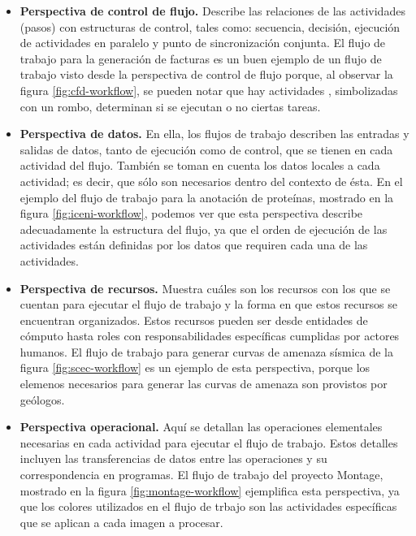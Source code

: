 \begin{itemize}
\item{\textbf{Perspectiva de control de flujo.} Describe las relaciones de las actividades (pasos) con estructuras de control, tales como: secuencia, decisión, ejecución de actividades en paralelo y punto de sincronización conjunta. El flujo de trabajo para la generación de facturas es un buen ejemplo de un flujo de trabajo visto desde la perspectiva de control de flujo porque, al observar la figura \ref{fig:cfd-workflow}, se pueden notar que hay actividades , simbolizadas con un rombo, determinan si se ejecutan o no ciertas tareas.
}

\item{\textbf{Perspectiva de datos.} En ella, los flujos de trabajo describen las entradas y salidas de datos, tanto de ejecución como de control, que se tienen en cada actividad del flujo. También se toman en cuenta los datos locales a cada actividad; es decir, que sólo son necesarios dentro del contexto de ésta. En el ejemplo del flujo de trabajo para la anotación de proteínas, mostrado en la figura \ref{fig:iceni-workflow}, podemos ver que esta perspectiva describe adecuadamente la estructura del flujo, ya que el orden de ejecución de las actividades están definidas por los datos que requiren cada una de las actividades.}

\item{\textbf{Perspectiva de recursos.} Muestra cuáles son los recursos con los que se cuentan para ejecutar el flujo de trabajo y la forma en que estos recursos se encuentran organizados. Estos recursos pueden ser desde entidades de cómputo hasta roles con responsabilidades específicas cumplidas por actores humanos. El flujo de trabajo para generar curvas de amenaza sísmica de la figura \ref{fig:scec-workflow} es un ejemplo de esta perspectiva, porque los elemenos necesarios para generar las curvas de amenaza son provistos por geólogos.}

\item{\textbf{Perspectiva operacional.} Aquí se detallan las operaciones elementales necesarias en cada actividad para ejecutar el flujo de trabajo. Estos detalles incluyen las transferencias de datos entre las operaciones y su correspondencia en programas. El flujo de trabajo del proyecto Montage, mostrado en la figura \ref{fig:montage-workflow} ejemplifica esta perspectiva, ya que los colores utilizados en el flujo de trbajo son las actividades específicas que se aplican a cada imagen a procesar.}
\end{itemize}

